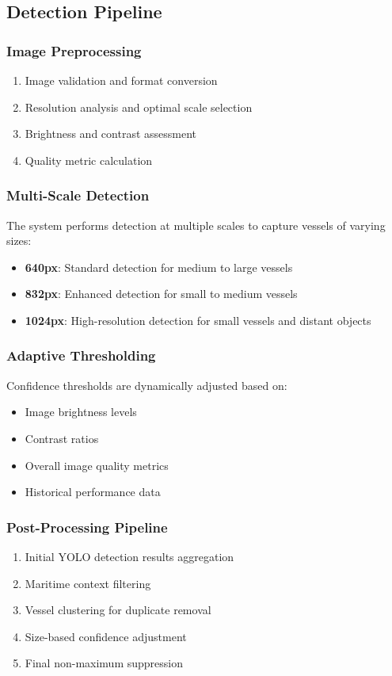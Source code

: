 \documentclass[a4paper,11pt]{article}
\begin{document}
\subsection{Detection Pipeline}

\subsubsection{Image Preprocessing}
\begin{enumerate}
    \item Image validation and format conversion
    \item Resolution analysis and optimal scale selection
    \item Brightness and contrast assessment
    \item Quality metric calculation
\end{enumerate}

\subsubsection{Multi-Scale Detection}
The system performs detection at multiple scales to capture vessels of varying sizes:
\begin{itemize}
    \item \textbf{640px}: Standard detection for medium to large vessels
    \item \textbf{832px}: Enhanced detection for small to medium vessels
    \item \textbf{1024px}: High-resolution detection for small vessels and distant objects
\end{itemize}

\subsubsection{Adaptive Thresholding}
Confidence thresholds are dynamically adjusted based on:
\begin{itemize}
    \item Image brightness levels
    \item Contrast ratios
    \item Overall image quality metrics
    \item Historical performance data
\end{itemize}

\subsubsection{Post-Processing Pipeline}
\begin{enumerate}
    \item Initial YOLO detection results aggregation
    \item Maritime context filtering
    \item Vessel clustering for duplicate removal
    \item Size-based confidence adjustment
    \item Final non-maximum suppression
\end{enumerate}
\end{document}
